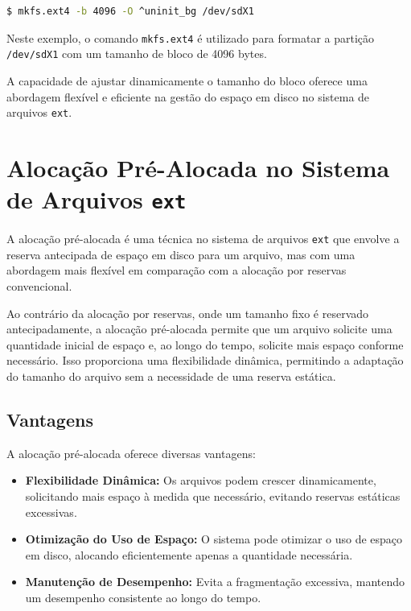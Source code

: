 \documentclass[
	12pt,				%
	openright,			%
	oneside,			%
	a4paper,			%
	chapter=TITLE,		%
	english,			%
	french,				%
	spanish,			%
	brazil				%
	]{abntex2}
\theoremstyle{definition}
\begin{document}
\begin{lstlisting}[language=bash, caption={Exemplo de Tamanho de Bloco Variável}]
$ mkfs.ext4 -b 4096 -O ^uninit_bg /dev/sdX1
\end{lstlisting}

Neste exemplo, o comando \texttt{mkfs.ext4} é utilizado para formatar a partição \texttt{/dev/sdX1} com um tamanho de bloco de 4096 bytes.

A capacidade de ajustar dinamicamente o tamanho do bloco oferece uma abordagem flexível e eficiente na gestão do espaço em disco no sistema de arquivos \texttt{ext}.

\section{Alocação Pré-Alocada no Sistema de Arquivos \texttt{ext}}
A alocação pré-alocada é uma técnica no sistema de arquivos \texttt{ext} que envolve a reserva antecipada de espaço em disco para um arquivo, mas com uma abordagem mais flexível em comparação com a alocação por reservas convencional.

Ao contrário da alocação por reservas, onde um tamanho fixo é reservado antecipadamente, a alocação pré-alocada permite que um arquivo solicite uma quantidade inicial de espaço e, ao longo do tempo, solicite mais espaço conforme necessário. Isso proporciona uma flexibilidade dinâmica, permitindo a adaptação do tamanho do arquivo sem a necessidade de uma reserva estática.

\subsection{Vantagens}
A alocação pré-alocada oferece diversas vantagens:

\begin{itemize}
    \item \textbf{Flexibilidade Dinâmica:} Os arquivos podem crescer dinamicamente, solicitando mais espaço à medida que necessário, evitando reservas estáticas excessivas.
    
    \item \textbf{Otimização do Uso de Espaço:} O sistema pode otimizar o uso de espaço em disco, alocando eficientemente apenas a quantidade necessária.
    
    \item \textbf{Manutenção de Desempenho:} Evita a fragmentação excessiva, mantendo um desempenho consistente ao longo do tempo.
\end{itemize}
\end{document}
